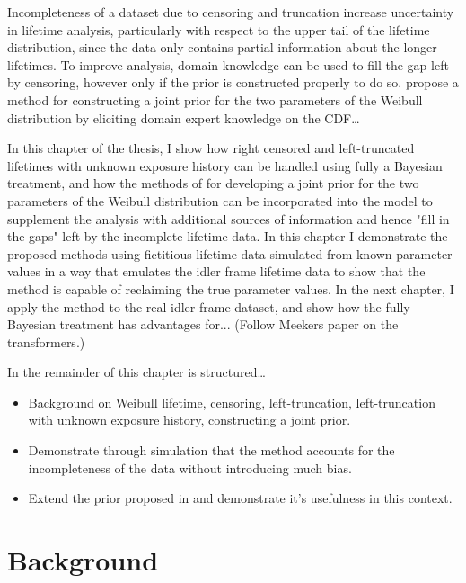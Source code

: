 Incompleteness of a dataset due to censoring and truncation increase uncertainty in lifetime analysis, particularly with respect to the upper tail of the lifetime distribution, since the data only contains partial information about the longer lifetimes. To improve analysis, domain knowledge can be used to fill the gap left by censoring, however only if the prior is constructed properly to do so. \citet{kaminskiy2005} propose a method for constructing a joint prior for the two parameters of the Weibull distribution by eliciting domain expert knowledge on the CDF\ldots

In this chapter of the thesis, I show how right censored and left-truncated lifetimes with unknown exposure history can be handled using fully a Bayesian treatment, and how the methods of \citet{kaminskiy2005} for developing a joint prior for the two parameters of the Weibull distribution can be incorporated into the model to supplement the analysis with additional sources of information and hence "fill in the gaps" left by the incomplete lifetime data. In this chapter I demonstrate the proposed methods using fictitious lifetime data simulated from known parameter values in a way that emulates the idler frame lifetime data to show that the method is capable of reclaiming the true parameter values. In the next chapter, I apply the method to the real idler frame dataset, and show how the fully Bayesian treatment has advantages for... (Follow Meekers paper on the transformers.)

In the remainder of this chapter is structured\ldots

\begin{itemize}
    \item Background on Weibull lifetime, censoring, left-truncation, left-truncation with unknown exposure history, constructing a joint prior.
    \item Demonstrate through simulation that the method accounts for the incompleteness of the data without introducing much bias.
    \item Extend the prior proposed in \citet{kaminskiy2005} and demonstrate it's usefulness in this context.
\end{itemize}


\section{Background}

